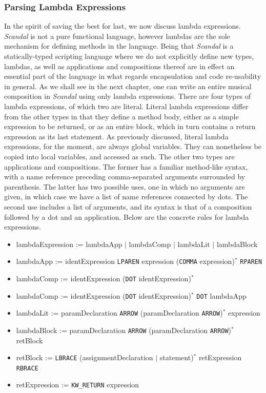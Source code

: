 \subsubsection{Parsing Lambda Expressions}

In the spirit of saving the best for last, we now discuss lambda expressions. \emph{Scandal} is not a pure functional language, however lambdas are the sole mechanism for defining methods in the language. Being that \emph{Scandal} is a statically-typed scripting language where we do not explicitly define new types, lambdas, as well as applications and compositions thereof are in effect an essential part of the language in what regards encapsulation and code re-usability in general. As we shall see in the next chapter, one can write an entire musical composition in \emph{Scandal} using only lambda expressions. There are four types of lambda expressions, of which two are literal. Literal lambda expressions differ from the other types in that they define a method body, either as a simple expression to be returned, or as an entire block, which in turn contains a return expression as its last statement. As previously discussed, literal lambda expressions, for the moment, are always global variables. They can nonetheless be copied into local variables, and accessed as such. The other two types are applications and compositions. The former has a familiar method-like syntax, with a name reference preceding comma-separated arguments surrounded by parenthesis. The latter has two possible uses, one in which no arguments are given, in which case we have a list of name references connected by dots. The second use includes a list of arguments, and its syntax is that of a composition followed by a dot and an application. Below are the concrete rules for lambda expressions.

\begin{itemize}
	\item lambdaExpression := lambdaApp $|$ lambdaComp $|$ lambdaLit $|$ lambdaBlock
	\item lambdaApp := identExpression \texttt{LPAREN} expression (\texttt{COMMA} expression)$^*$ \texttt{RPAREN}
	\item lambdaComp := identExpression (\texttt{DOT} identExpression)$^*$
	\item lambdaComp := identExpression (\texttt{DOT} identExpression)$^*$ \texttt{DOT} lambdaApp
	\item lambdaLit := paramDeclaration \texttt{ARROW} (paramDeclaration \texttt{ARROW})$^*$ expression
	\item lambdaBlock := paramDeclaration \texttt{ARROW} (paramDeclaration \texttt{ARROW})$^*$ retBlock
	\item retBlock := \texttt{LBRACE} (assignmentDeclaration $|$ statement)$^*$ retExpression \texttt{RBRACE}
	\item retExpression := \texttt{KW\_RETURN} expression
\end{itemize}

